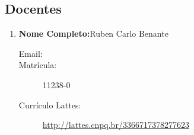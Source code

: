 \documentclass[a4paper,12pt]{article} %
\begin{document}
\begin{enumerate}
\end{enumerate}


\subsection*{Docentes}

\begin{enumerate}
    \item \textbf{Nome Completo:}Ruben Carlo Benante
    \begin{description}
        \item [Email:] 
        \item [Matrícula:] 11238-0
        \item [Currículo Lattes:] \url{http://lattes.cnpq.br/3366717378277623}
    \end{description}
\end{enumerate}



\nocite{*}


\end{document}
